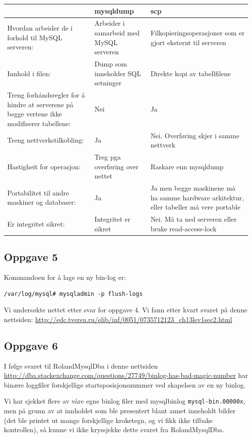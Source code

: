 \documentclass[a4paper, norsk, 12pt]{article}
\begin{document}
\begin{tabularx}{\textwidth}{|X|X|X|} \hline
 & \textbf{mysqldump} & \textbf{scp} \\ \hline
Hvordan arbeider de i forhold til MySQL serveren: & Arbeider i samarbeid med MySQL serveren & Filkopieringsoperasjoner som er gjort eksternt til serveren \\ \hline
Innhold i filen: & Dump som inneholder SQL setninger & Direkte kopi av tabellfilene \\ \hline
Treng forhåndsregler for å hindre at serverene på begge vertene ikke modifiserer tabellene: & Nei & Ja \\ \hline
Treng nettverkstilkobling: & Ja & Nei. Overføring skjer i samme nettverk \\ \hline
Hastigheit for operasjon: & Treg pga overføring over nettet & Raskare enn mysqldump \\ \hline
Portabilitet til andre maskiner og databaser: & Ja & Ja men begge maskinene må ha samme hardware arkitektur, eller tabeller må vere portable \\ \hline
Er integritet sikret: & Integritet er sikret & Nei. Må ta ned serveren eller bruke read-access-lock \\ \hline

\end{tabularx}

\subsection{Oppgave 5}
Kommandoen for å lage en ny bin-log er:\hspace*{\fill} \\[-\dimexpr\baselineskip+\parskip\relax]
\begin{verbatim}
/var/log/mysql# mysqladmin -p flush-logs
\end{verbatim}
Vi undersøkte nettet etter svar for oppgave 4. Vi fann etter kvart svaret på denne nettsiden:
\url{http://edc.tversu.ru/elib/inf/0051/0735712123_ch13lev1sec2.html}

\subsection{Oppgave 6}
I følge svaret til RolandMysqlDba i denne nettsiden \url{http://dba.stackexchange.com/questions/27749/binlog-has-bad-magic-number} har binære loggfiler forskjellige startsposisjonsnummer ved skapelsen av en ny binlog.

Vi har sjekket flere av våre egne binlog filer med mysqlbinlog \verb|mysql-bin.00000x|, men på grunn av at innholdet som ble presentert blant annet inneholdt bilder (det ble printet ut mange forskjellige kroketegn, og vi fikk ikke tilbake kontrollen), så kunne vi ikke kryssjekke dette svaret fra RolandMysqlDba.
\end{document}
